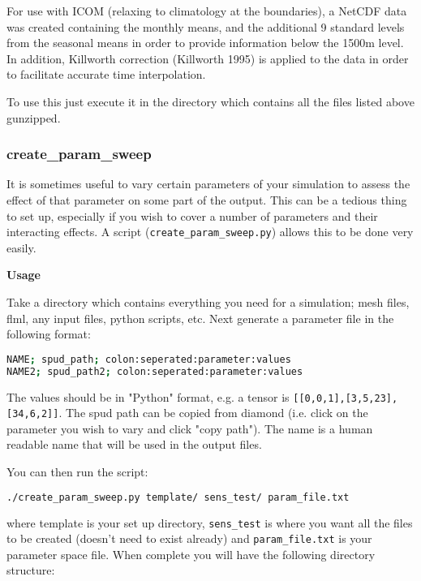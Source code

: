 For use with ICOM (relaxing to climatology at the boundaries), a NetCDF data was created containing the monthly means, and the additional 9 standard levels from the seasonal means in order to provide information below the 1500m level. In addition, Killworth correction (Killworth 1995) is applied to the data in order to facilitate accurate time interpolation.

To use this just execute it in the directory which contains all the files listed above gunzipped.

\subsubsection{create\_param\_sweep}
\label{sect:create_param_sweep}

It is sometimes useful to vary certain parameters of your simulation to assess the effect of 
that parameter on some part of the output. This can be a tedious thing to set up, especially 
if you wish to cover a number of parameters and their interacting effects.
A script (\lstinline[language = Bash]+create_param_sweep.py+) allows this to be done very easily.

\textbf{Usage}

Take a directory which contains everything you need for a simulation; mesh files, 
flml, any input files, python scripts, etc. Next generate a parameter file in the following format:

\begin{lstlisting}[language = Bash]
NAME; spud_path; colon:seperated:parameter:values
NAME2; spud_path2; colon:seperated:parameter:values
\end{lstlisting}

The values should be in "Python" format, e.g. a tensor is 
\lstinline[language = Bash]+[[0,0,1],[3,5,23],[34,6,2]]+. 
The spud path can be copied from diamond (i.e. click on the parameter you wish to vary
and click "copy path"). The name is a human readable name that will be used in the output files.

You can then run the script:

\begin{lstlisting}[language = Bash]
./create_param_sweep.py template/ sens_test/ param_file.txt 
\end{lstlisting}

where template is your set up directory, \lstinline[language = Bash]+sens_test+ 
is where you want all the files to be created 
(doesn't need to exist already) and \lstinline[language = Bash]+param_file.txt+ is your parameter space file.
When complete you will have the following directory structure:

